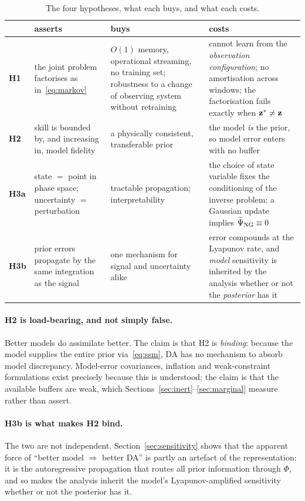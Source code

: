 \begin{table}[t]
\centering
\small
\begin{tabular}{@{}p{}p{}p{}p{}@{}}
\toprule
& \textbf{asserts} & \textbf{buys} & \textbf{costs} \\
\midrule
\textbf{H1} & the joint problem factorises as in~\eqref{eq:markov} & $O(1)$ memory,
operational streaming, no training set; robustness to a change of observing
system without retraining & cannot learn from the \emph{observation
configuration}; no amortisation across windows; the factorisation fails exactly
when $\mathbf{z}^{*}\neq\mathbf{z}$ \\[0.4em]
\textbf{H2} & skill is bounded by, and increasing in, model fidelity & a
physically consistent, transferable prior & the model \emph{is} the prior, so
model error enters with no buffer \\[0.4em]
\textbf{H3a} & state $=$ point in phase space; uncertainty $=$ perturbation &
tractable propagation; interpretability & the choice of state variable fixes the
conditioning of the inverse problem; a Gaussian update implies
$\widetilde{\Psi}_{\mathrm{NG}} \equiv 0$ \\[0.4em]
\textbf{H3b} & prior errors propagate by the same integration as the signal &
one mechanism for signal and uncertainty alike & error compounds at the Lyapunov
rate, and \emph{model} sensitivity is inherited by the analysis whether or not
the \emph{posterior} has it \\
\bottomrule
\end{tabular}
\caption{The four hypotheses, what each buys, and what each costs.}
\label{tab:hypotheses}
\end{table}

\paragraph{H2 is load-bearing, and not simply false.}
Better models do assimilate better. The claim is that H2 is \emph{binding}:
because the model supplies the entire prior via~\eqref{eq:ssm}, DA has no
mechanism to absorb model discrepancy. Model-error covariances, inflation and
weak-constraint formulations exist precisely because this is understood; the
claim is that the available buffers are weak, which
Sections~\ref{sec:inert}--\ref{sec:marginal} measure rather than assert.

\paragraph{H3b is what makes H2 bind.}
The two are not independent. Section~\ref{sec:sensitivity} shows that the
apparent force of ``better model $\Rightarrow$ better DA'' is partly an artefact
of the representation: it is the autoregressive propagation that routes all prior
information through $\Phi$, and so makes the analysis inherit the model's
Lyapunov-amplified sensitivity whether or not the posterior has it.
